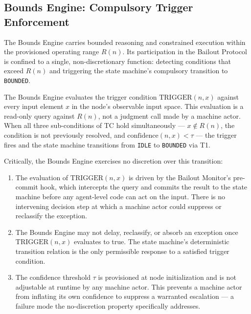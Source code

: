 \subsection{Bounds Engine: Compulsory Trigger Enforcement}
\label{sec:bounds-trigger}

The Bounds Engine carries bounded reasoning and constrained execution within the provisioned operating range $R(n)$. Its participation in the Bailout Protocol is confined to a single, non-discretionary function: detecting conditions that exceed $R(n)$ and triggering the state machine's compulsory transition to \texttt{BOUNDED}.

The Bounds Engine evaluates the trigger condition $\text{TRIGGER}(n, x)$ against every input element $x$ in the node's observable input space. This evaluation is a read-only query against $R(n)$, not a judgment call made by a machine actor. When all three sub-conditions of TC hold simultaneously — $x \notin R(n)$, the condition is not previously resolved, and $\text{confidence}(n, x) < \tau$ — the trigger fires and the state machine transitions from \texttt{IDLE} to \texttt{BOUNDED} via T1.

Critically, the Bounds Engine exercises no discretion over this transition:

\begin{enumerate}\itemsep=0pt
\item The evaluation of $\text{TRIGGER}(n, x)$ is driven by the Bailout Monitor's pre-commit hook, which intercepts the query and commits the result to the state machine before any agent-level code can act on the input. There is no intervening decision step at which a machine actor could suppress or reclassify the exception.

\item The Bounds Engine may not delay, reclassify, or absorb an exception once $\text{TRIGGER}(n, x)$ evaluates to true. The state machine's deterministic transition relation is the only permissible response to a satisfied trigger condition.

\item The confidence threshold $\tau$ is provisioned at node initialization and is not adjustable at runtime by any machine actor. This prevents a machine actor from inflating its own confidence to suppress a warranted escalation — a failure mode the no-discretion property specifically addresses.
\end{enumerate}

